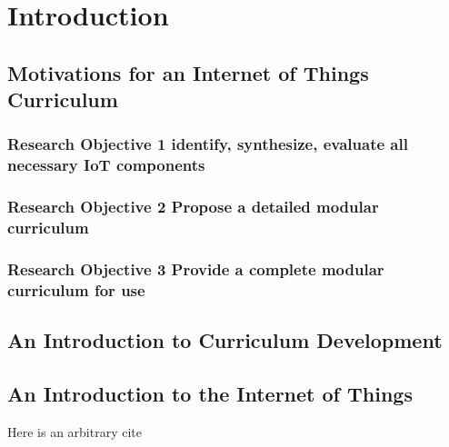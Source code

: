 \chapter{Introduction}

\section{Motivations for an Internet of Things Curriculum}
\subsection{Research Objective 1 identify, synthesize, evaluate all necessary IoT components}
\subsection{Research Objective 2 Propose a detailed modular curriculum}
\subsection{Research Objective 3 Provide a complete modular curriculum for use}
\section{An Introduction to Curriculum Development}

\section{An Introduction to the Internet of Things}

Here is an arbitrary cite


%

\vfill

